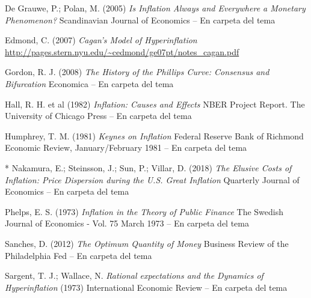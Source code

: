 \documentclass{nuevotema}
\begin{document}
De Grauwe, P.; Polan, M. (2005) \textit{Is Inflation Always and Everywhere a Monetary Phenomenon?}  Scandinavian Journal of Economics -- En carpeta del tema

Edmond, C. (2007) \textit{Cagan's Model of Hyperinflation}  \url{http://pages.stern.nyu.edu/~cedmond/ge07pt/notes_cagan.pdf}

Gordon, R. J. (2008) \textit{The History of the Phillips Curve: Consensus and Bifurcation} Economica -- En carpeta del tema

Hall, R. H. et al (1982) \textit{Inflation: Causes and Effects} NBER Project Report. The University of Chicago Press -- En carpeta del tema

Humphrey, T. M. (1981) \textit{Keynes on Inflation} Federal Reserve Bank of Richmond Economic Review, January/February 1981 -- En carpeta del tema

* Nakamura, E.; Steinsson, J.; Sun, P.; Villar, D. (2018) \textit{The Elusive Costs of Inflation: Price Dispersion during the U.S. Great Inflation} Quarterly Journal of Economics -- En carpeta del tema

Phelps, E. S. (1973) \textit{Inflation in the Theory of Public Finance} The Swedish Journal of Economics - Vol. 75 March 1973 -- En carpeta del tema

Sanches, D. (2012) \textit{The Optimum Quantity of Money} Business Review of the Philadelphia Fed -- En carpeta del tema

Sargent, T. J.; Wallace, N. \textit{Rational expectations and the Dynamics of Hyperinflation} (1973) International Economic Review -- En carpeta del tema
\end{document}
